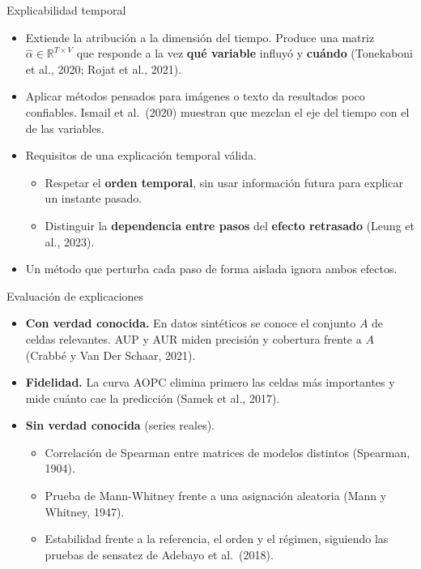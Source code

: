 \documentclass{beamer}
\begin{document}
\begin{frame}{Explicabilidad temporal}
    \small
    \begin{itemize}
        \item Extiende la atribución a la dimensión del tiempo. Produce
        una matriz $\hat{\alpha}\in\mathbb{R}^{T\times V}$ que responde a
        la vez \textbf{qué variable} influyó y \textbf{cuándo}
        (Tonekaboni et al., 2020; Rojat et al., 2021).
        \vspace{0.12cm}
        \item Aplicar métodos pensados para imágenes o texto da
        resultados poco confiables. Ismail et al.\ (2020) muestran que
        mezclan el eje del tiempo con el de las variables.
        \vspace{0.12cm}
        \item Requisitos de una explicación temporal válida.
        \begin{itemize}
            \item Respetar el \textbf{orden temporal}, sin usar
            información futura para explicar un instante pasado.
            \item Distinguir la \textbf{dependencia entre pasos} del
            \textbf{efecto retrasado} (Leung et al., 2023).
        \end{itemize}
        \vspace{0.12cm}
        \item Un método que perturba cada paso de forma aislada ignora
        ambos efectos.
    \end{itemize}
\end{frame}


\begin{frame}{Evaluación de explicaciones}
    \small
    \begin{itemize}
        \item \textbf{Con verdad conocida.} En datos sintéticos se
        conoce el conjunto $A$ de celdas relevantes. AUP y AUR miden
        precisión y cobertura frente a $A$ (Crabbé y Van Der Schaar, 2021).
        \vspace{0.12cm}
        \item \textbf{Fidelidad.} La curva AOPC elimina primero las celdas
        más importantes y mide cuánto cae la predicción (Samek et al.,
        2017).
        \vspace{0.12cm}
        \item \textbf{Sin verdad conocida} (series reales).
        \begin{itemize}
            \item Correlación de Spearman entre matrices de modelos
            distintos (Spearman, 1904).
            \item Prueba de Mann-Whitney frente a una asignación
            aleatoria (Mann y Whitney, 1947).
            \item Estabilidad frente a la referencia, el orden y el
            régimen, siguiendo las pruebas de sensatez de Adebayo et al.\
            (2018).
        \end{itemize}
    \end{itemize}
\end{frame}
\end{document}
